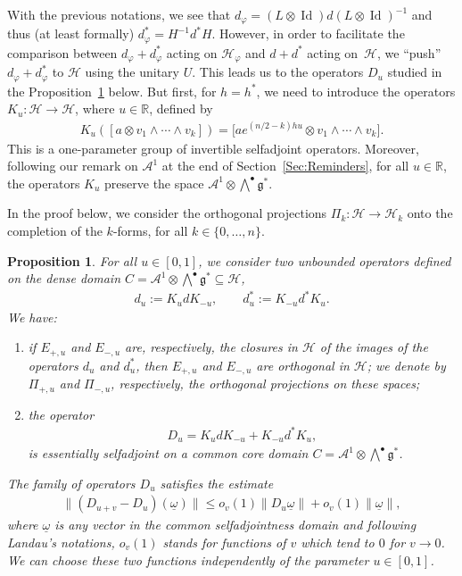 \documentclass[pdftex]{sigma}
\newtheorem{Proposition}[Theorem]{Proposition}
 { \theoremstyle{definition}
\newtheorem{Definition}[Theorem]{Definition}
\newtheorem{Note}[Theorem]{Note}
\newtheorem{Example}[Theorem]{Example}
\newtheorem{Remark}[Theorem]{Remark} }
\newcommand{\Aa}{\mathcal{A}}
\newcommand{\Core}{C}
\newcommand{\Hh}{\mathscr{H}}
\newcommand{\LieG}{\mathfrak{g}}
\newcommand{\omegat}{\underline{\omega}}
\newcommand{\R}{\mathbb{R}}
\DeclareMathOperator{\id}{Id}
\numberwithin{equation}{section}
\begin{document}
With the previous notations, we see that $d_\varphi = (L \otimes \id) d (L \otimes \id)^{-1}$ and thus (at least formally) $d_\varphi^* = H^{-1} d^* H$. However, in order to facilitate the comparison between $d_\varphi + d^*_\varphi$ acting on $\Hh_\varphi$ and $d + d^*$ acting on~$\Hh$, we ``push'' $d_\varphi + d_\varphi^*$ to $\Hh$ using the unitary $U$. This leads us to the operators $D_u$ studied in the Proposition~\ref{Prop:Du} below. But f\/irst, for $h = h^*$, we need to introduce the operators $K_{u} \colon \Hh \to \Hh$, where $u \in \R$, def\/ined by
\begin{gather}
\label{Eqn:DefKu}
K_{u}( [a \otimes v_1 \wedge \cdots \wedge v_k ]) = \big[a e^{(n/2 - k)h u} \otimes v_1 \wedge \cdots \wedge v_k\big].
\end{gather}
This is a one-parameter group of invertible selfadjoint operators. Moreover, following our remark on $\Aa^1$ at the end of Section~\ref{Sec:Reminders}, for all $u \in \R$, the operators $K_u$ preserve the space $\Aa^1 \otimes \bigwedge^\bullet \LieG^*$.

In the proof below, we consider the orthogonal projections $\Pi_k \colon \Hh \to \Hh_k$ onto the completion of the $k$-forms, for all $k \in \{0, \ldots, n \}$.
\begin{Proposition}
\label{Prop:Du}
For all $u \in [0,1]$, we consider two unbounded operators defined on the dense domain $\Core = \Aa^1 \otimes \bigwedge^\bullet \LieG^* \subseteq \Hh$,
\begin{gather*}
d_u := K_{u} d K_{-u},
\qquad
d_u^* := K_{-u} d^* K_{u}.
\end{gather*}
We have:
\begin{enumerate}\itemsep=0pt
\item[$(1)$] %
if $E_{+,u}$ and $E_{-, u}$ are, respectively, the closures in $\Hh$ of the images of the operators $d_u$ and $d_u^*$, then $E_{+,u}$ and $E_{-, u}$ are orthogonal in $\Hh$; we denote by $\Pi_{+,u}$ and $\Pi_{-,u}$, respectively, the orthogonal projections on these spaces;
\item[$(2)$] %
the operator
\begin{gather*}
D_{u} = K_{u} d K_{-u} + K_{-u} d^* K_{u},
\end{gather*}
is essentially selfadjoint on a common core domain $\Core = \Aa^1 \otimes \bigwedge^\bullet \LieG^*$.
\end{enumerate}
The family of operators $D_u$ satisfies the estimate
\begin{gather}
\label{Eqn:EstimateDu}
\| (D_{u+v} - D_u)(\omegat) \| \leqslant o_v(1) \| D_u \omegat \| + o_v(1) \| \omegat \|,
\end{gather}
where $\omegat$ is any vector in the common selfadjointness domain and following Landau's notations, $o_v(1)$ stands for functions of $v$ which tend to $0$ for $v \to 0$. We can choose these two functions independently of the parameter $u \in [0,1]$.
\end{Proposition}
\end{document}
